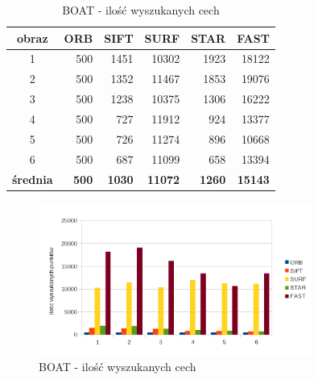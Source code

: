 \begin{table}[htbp]
  \centering
  \caption{BOAT - ilość wyszukanych cech}
    \begin{tabular}{|c|r|r|r|r|r|}\hline
    
    obraz & \textbf{ORB} & \textbf{SIFT} & \textbf{SURF} & \textbf{STAR} & \textbf{FAST} \\\hline
    
   1 & 500 & 1451 & 10302 & 1923 & 18122 \\
    2 & 500 & 1352 & 11467 & 1853 & 19076 \\
    3 & 500 & 1238 & 10375 & 1306 & 16222 \\
    4 & 500 & 727 & 11912 & 924 & 13377 \\
    5 & 500 & 726 & 11274 & 896 & 10668 \\
    6 & 500 & 687 & 11099 & 658 & 13394 \\\hline
    \textbf{średnia} & \textbf{500} & \textbf{1030} & \textbf{11072} & \textbf{1260} & \textbf{15143} \\
   \hline
    \end{tabular}%
  \label{tab:boat_f1}%
\end{table}%


\begin{figure}
\centering
\includegraphics[width=0.8\textwidth]{pict/mikolajczyk/boat/F1.png}
\caption{BOAT - ilość wyszukanych cech}
\label{fig:boat_f1}
\end{figure}


